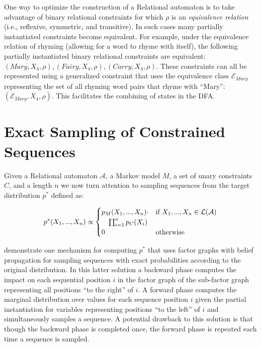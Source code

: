\documentclass[phd,electronic,oneside,twosidetoc,letterpaper,chaptercenter,parttop,lol,lof,lot]{byumsphd}
\newcommand\mydots{\hbox to .75em{.\hss.\hss.}}
\begin{document}
One way to optimize the construction of a {\sc Relational} automaton is to take advantage of binary relational constraints for which $\rho$ is an \emph{equivalence relation} (i.e., reflexive, symmetric, and transitive). In such cases many partially instantiated constraints become equivalent. For example, under the equivalence relation of rhyming (allowing for a word to rhyme with itself), the following partially instantiated binary relational constraints are equivalent: $(Mary,X_4,\rho),(Fairy,X_4,\rho),(Carry,X_4,\rho)$. These constraints can all be represented using a generalized constraint that uses the equivalence class $\mathcal{E}_{Mary}$ representing the set of all rhyming word pairs that rhyme with ``Mary'': $(\mathcal{E}_{Mary},X_4,\rho)$. This facilitates the combining of states in the DFA.

\section{Exact Sampling of Constrained Sequences}

Given a {\sc Relational} automaton $\mathcal{A}$, a Markov model $M$, a set of unary constraints $C$, and a length $n$ we now turn attention to sampling sequences from the target distribution $p^*$ defined as:

\[
  p^*(X_1,\mydots,X_n) \propto   
  \begin{cases}
	p_M(X_1,\mydots,X_n)\cdot & \text{if } X_1,\mydots,X_n \in 	\mathcal{L}(\mathcal{A})\\
    \quad \prod_{i=1}^n p_C(X_i)\\
	0 & \text{otherwise}
  \end{cases}
\]

\cite{papadopoulos2015exact} demonstrate one mechanism for computing $p^*$ that uses factor graphs with belief propagation for sampling sequences with exact probabilities according to the original distribution. In this latter solution a backward phase computes the impact on each sequential position $i$ in the factor graph of the sub-factor graph representing all positions ``to the right'' of $i$. A forward phase computes the marginal distribution over values for each sequence position $i$ given the partial instantiation for variables representing positions ``to the left'' of $i$ and simultaneously samples a sequence. A potential drawback to this solution is that though the backward phase is completed once, the forward phase is repeated each time a sequence is sampled. 
\end{document}
